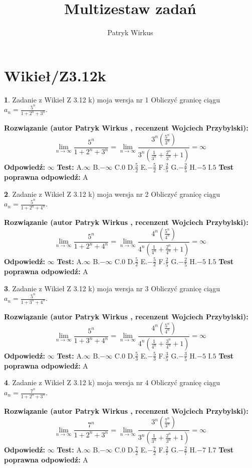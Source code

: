 \documentclass[12pt, a4paper]{article}
\title{Multizestaw zadań}
\author{Patryk Wirkus}
\date{}
\theoremstyle{definition} %
\newtheorem{zad}{}
\newcommand{\kategoria}[1]{\section{#1}}
\newcommand{\zadStart}[1]{\begin{zad}#1\newline}
\newcommand{\zadStop}{\end{zad}}
\newcommand{\rozwStart}[2]{\noindent \textbf{Rozwiązanie (autor #1 , recenzent #2): }\newline}
\newcommand{\rozwStop}{\newline}
\newcommand{\odpStart}{\noindent \textbf{Odpowiedź:}\newline}
\newcommand{\odpStop}{\newline}
\newcommand{\testStart}{\noindent \textbf{Test:}\newline}
\newcommand{\testStop}{\newline}
\newcommand{\kluczStart}{\noindent \textbf{Test poprawna odpowiedź:}\newline}
\newcommand{\kluczStop}{\newline}
\begin{document}
\maketitle

\kategoria{Wikieł/Z3.12k}


\zadStart{Zadanie z Wikieł Z 3.12 k) moja wersja nr 1}
Obliczyć granicę ciągu $a_{n}=\frac{5^{n}}{1+2^{n} + 3^{n}}$.
\zadStop
\rozwStart{Patryk Wirkus}{Wojciech Przybylski}
$$\lim\limits_{n\to\infty}\frac{5^{n}}{1+2^{n} + 3^{n}}=
\lim\limits_{n\to\infty}\frac{3^{n}(\frac{5^{n}}{3^{n}} )}{3^{n}(\frac{1}{3^{n}}+\frac{2^{n}}{3^{n}}+1)} = \infty$$
\rozwStop
\odpStart
$\infty$
\odpStop
\testStart
A.$\infty$
B.$-\infty$
C.$0$
D.$\frac{5}{2}$
E.$-\frac{5}{2}$
F.$\frac{2}{5}$
G.$-\frac{2}{5}$
H.$-5$
I.$5$
\testStop
\kluczStart
A
\kluczStop



\zadStart{Zadanie z Wikieł Z 3.12 k) moja wersja nr 2}
Obliczyć granicę ciągu $a_{n}=\frac{5^{n}}{1+2^{n} + 4^{n}}$.
\zadStop
\rozwStart{Patryk Wirkus}{Wojciech Przybylski}
$$\lim\limits_{n\to\infty}\frac{5^{n}}{1+2^{n} + 4^{n}}=
\lim\limits_{n\to\infty}\frac{4^{n}(\frac{5^{n}}{4^{n}} )}{4^{n}(\frac{1}{4^{n}}+\frac{2^{n}}{4^{n}}+1)} = \infty$$
\rozwStop
\odpStart
$\infty$
\odpStop
\testStart
A.$\infty$
B.$-\infty$
C.$0$
D.$\frac{5}{2}$
E.$-\frac{5}{2}$
F.$\frac{2}{5}$
G.$-\frac{2}{5}$
H.$-5$
I.$5$
\testStop
\kluczStart
A
\kluczStop



\zadStart{Zadanie z Wikieł Z 3.12 k) moja wersja nr 3}
Obliczyć granicę ciągu $a_{n}=\frac{5^{n}}{1+3^{n} + 4^{n}}$.
\zadStop
\rozwStart{Patryk Wirkus}{Wojciech Przybylski}
$$\lim\limits_{n\to\infty}\frac{5^{n}}{1+3^{n} + 4^{n}}=
\lim\limits_{n\to\infty}\frac{4^{n}(\frac{5^{n}}{4^{n}} )}{4^{n}(\frac{1}{4^{n}}+\frac{3^{n}}{4^{n}}+1)} = \infty$$
\rozwStop
\odpStart
$\infty$
\odpStop
\testStart
A.$\infty$
B.$-\infty$
C.$0$
D.$\frac{5}{3}$
E.$-\frac{5}{3}$
F.$\frac{3}{5}$
G.$-\frac{3}{5}$
H.$-5$
I.$5$
\testStop
\kluczStart
A
\kluczStop



\zadStart{Zadanie z Wikieł Z 3.12 k) moja wersja nr 4}
Obliczyć granicę ciągu $a_{n}=\frac{7^{n}}{1+2^{n} + 3^{n}}$.
\zadStop
\rozwStart{Patryk Wirkus}{Wojciech Przybylski}
$$\lim\limits_{n\to\infty}\frac{7^{n}}{1+2^{n} + 3^{n}}=
\lim\limits_{n\to\infty}\frac{3^{n}(\frac{7^{n}}{3^{n}} )}{3^{n}(\frac{1}{3^{n}}+\frac{2^{n}}{3^{n}}+1)} = \infty$$
\rozwStop
\odpStart
$\infty$
\odpStop
\testStart
A.$\infty$
B.$-\infty$
C.$0$
D.$\frac{7}{2}$
E.$-\frac{7}{2}$
F.$\frac{2}{7}$
G.$-\frac{2}{7}$
H.$-7$
I.$7$
\testStop
\kluczStart
A
\kluczStop
\end{document}
